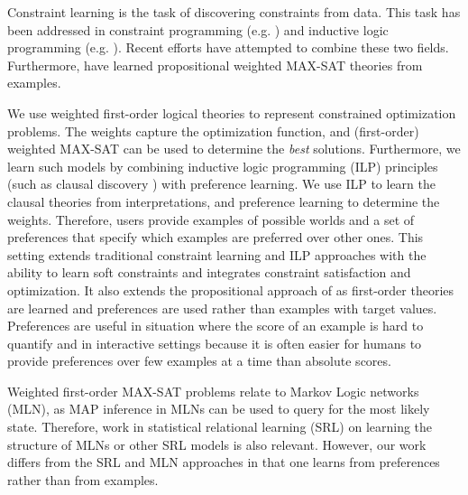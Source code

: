 \documentclass[letterpaper]{article}
\theoremstyle{definition}
\begin{document}
Constraint learning is the task of discovering constraints from data.
This task has been addressed in constraint programming (e.g. \cite{Beldiceanu:ModelSeeker,bessiere2013constraint}) and inductive logic programming (e.g. \cite{DeRaedt:ClausalDiscovery}).
Recent efforts \cite{Lallouet:LearningCP} have attempted to combine these two fields.
Furthermore, \cite{campigotto2011active} have learned propositional weighted MAX-SAT theories from examples.

We use weighted first-order logical theories to represent constrained optimization problems.
The weights capture the optimization function, and (first-order) weighted MAX-SAT can be used to determine the \emph{best} solutions.
Furthermore, we learn such models by combining inductive logic programming (ILP) principles (such as clausal discovery \cite{DeRaedt:ClausalDiscovery}) with preference learning.
We use ILP to learn the clausal theories from interpretations, and preference learning to determine the weights.
Therefore, users provide examples of possible worlds and a set of preferences that specify which examples are preferred over other ones.
This setting extends traditional constraint learning and ILP approaches with the ability to learn soft constraints and integrates constraint satisfaction and optimization.
It also extends the propositional approach of \cite{campigotto2011active} as first-order theories are learned and preferences are used rather than examples with target values.
Preferences are useful in situation where the score of an example is hard to quantify and in interactive settings because it is often easier for humans to provide preferences over few examples at a time than absolute scores.

Weighted first-order MAX-SAT problems relate to Markov Logic networks (MLN), as MAP inference in MLNs can be used to query for the most likely state.
Therefore, work in statistical relational learning (SRL) on learning the structure of MLNs or other SRL models \cite{kok2005learning} is also relevant.
However, our work differs from the SRL and MLN approaches in that one learns from preferences rather than from examples.


\end{document}
